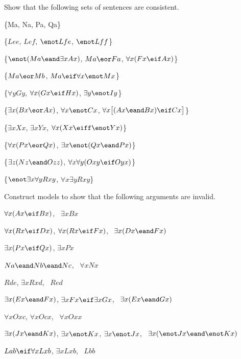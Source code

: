 \problempart
Show that the following sets of sentences are consistent.
\begin{earg}
\item \{Ma, \enot Na, Pa, \enot Qa\}
\item \{$Lee$, $Lef$, $\enot Lfe$, $\enot Lff$\}
\item \{$\enot (Ma \eand \exists x Ax)$, $Ma \eor Fa$, $\forall x(Fx \eif Ax)$\}
\item \{$Ma \eor Mb$, $Ma \eif \forall x \enot Mx$\}
\item \{$\forall y Gy$, $\forall x (Gx \eif Hx)$, $\exists y \enot Iy$\}
\item \{$\exists x(Bx \eor Ax)$, $\forall x \enot Cx$, $\forall x\bigl[(Ax \eand Bx) \eif Cx\bigr]$\}
\item \{$\exists x Xx$, $\exists x Yx$, $\forall x(Xx \eiff \enot Yx)$\}
\item \{$\forall x(Px \eor Qx)$, $\exists x\enot(Qx \eand Px)$\}
\item \{$\exists z(Nz \eand Ozz)$, $\forall x\forall y(Oxy \eif Oyx)$\}
\item \{$\enot \exists x \forall y Rxy$, $\forall x \exists y Rxy$\}
\end{earg}


\problempart
Construct models to show that the following arguments are invalid.
\begin{earg}
\item $\forall x(Ax \eif Bx)$, \therefore\ $\exists x Bx$
\item $\forall x(Rx \eif Dx)$, $\forall x(Rx \eif Fx)$, \therefore\ $\exists x(Dx \eand Fx)$
\item $\exists x(Px\eif Qx)$, \therefore $\exists x Px$
\item $Na \eand Nb \eand Nc$, \therefore\ $\forall x Nx$
\item $Rde$, $\exists x Rxd$, \therefore\ $Red$
\item $\exists x(Ex \eand Fx)$, $\exists x Fx \eif \exists x Gx$, \therefore\ $\exists x(Ex \eand Gx)$
\item $\forall x Oxc$, $\forall x Ocx$, \therefore\ $\forall x Oxx$
\item $\exists x(Jx \eand Kx)$, $\exists x \enot Kx$, $\exists x \enot Jx$, \therefore\ $\exists x(\enot Jx \eand \enot Kx)$
\item $Lab \eif \forall x Lxb$, $\exists x Lxb$, \therefore\ $Lbb$
\end{earg}





